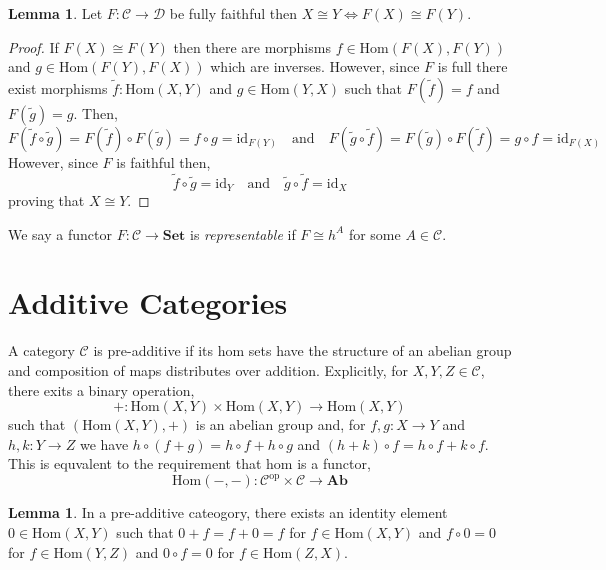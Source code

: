 \documentclass[12pt]{article}
\newcommand{\id}{\mathrm{id}}
\newcommand{\Hom}[2]{\mathrm{Hom}\left(#1, #2 \right)}
\newcommand{\Ab}{\mathbf{Ab}}
\newcommand{\C}{\mathcal{C}}
\newcommand{\D}{\mathcal{D}}
\newcommand{\Set}{\mathbf{Set}}
\theoremstyle{remark}
\theoremstyle{definition}
\newtheorem{lemma}[theorem]{Lemma}
\newenvironment{definition}[1][Definition:]{\begin{trivlist}
\item[\hskip \labelsep {\bfseries #1}]}{\end{trivlist}}
\begin{document}
\begin{lemma}
Let $F : \C \to \D$ be fully faithful then $X \cong Y \iff F(X) \cong F(Y)$.
\end{lemma}

\begin{proof}
If $F(X) \cong F(Y)$ then there are morphisms $f \in \Hom{F(X)}{F(Y)}$ and $g \in \Hom{F(Y)}{F(X)}$ which are inverses. However, since $F$ is full there exist morphisms $\tilde{f} : \Hom{X}{Y}$ and $g \in \Hom{Y}{X}$ such that $F(\tilde{f}) = f$ and $F(\tilde{g}) = g$. Then,
\[ F(\tilde{f} \circ \tilde{g}) = F(\tilde{f}) \circ F(\tilde{g}) = f \circ g = \id_{F(Y)} \quad \text{and} \quad F(\tilde{g} \circ \tilde{f}) = F(\tilde{g}) \circ F(\tilde{f}) = g \circ f = \id_{F(X)} \]
However, since $F$ is faithful then,
\[ \tilde{f} \circ \tilde{g} = \id_Y \quad \text{and} \quad \tilde{g} \circ \tilde{f} = \id_X \]
proving that $X \cong Y$. 
\end{proof}

\begin{definition}
We say a functor $F : \C \to \Set$ is \textit{representable} if $F \cong h^A$ for some $A \in \C$. 
\end{definition}

\section{Additive Categories}

\begin{definition}
A category $\mathcal{C}$ is pre-additive if its hom sets have the structure of an abelian group and composition of maps distributes over addition. Explicitly, for $X, Y, Z \in \mathcal{C}$, there exits a binary operation,
\[ + :  \Hom{X}{Y} \times \Hom{X}{Y} \to \Hom{X}{Y}\]
such that $(\Hom{X}{Y}, +)$ is an abelian group and, for $f, g : X \to Y$ and $h, k : Y \to Z$ we have $h \circ (f + g) = h \circ f + h \circ g$ and $(h + k) \circ f = h \circ f + k \circ f$. This is equvalent to the requirement that hom is a functor,
\[ \Hom{-}{-} : \mathcal{C}^{\mathrm{op}} \times \mathcal{C} \to \Ab \]
\end{definition}

\begin{lemma}
In a pre-additive cateogory, there exists an identity element $0 \in \Hom{X}{Y}$ such that $0 + f = f + 0 = f$ for $f \in \Hom{X}{Y}$ and $f \circ 0 = 0$ for $f \in \Hom{Y}{Z}$ and $0 \circ f = 0$ for $f \in \Hom{Z}{X}$.  
\end{lemma}
\end{document}

